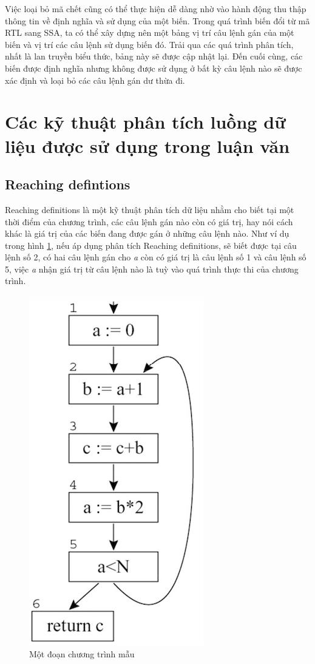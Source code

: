 Việc loại bỏ mã chết cũng có thể thực hiện dễ dàng nhờ vào hành động thu thập thông tin về định nghĩa và sử dụng của một biến. Trong quá trình biến đổi từ mã RTL sang SSA, ta có thể xây dựng nên một bảng vị trí câu lệnh gán của một biến và vị trí các câu lệnh sử dụng biến đó. Trải qua các quá trình phân tích, nhất là lan truyền biểu thức, bảng này sẽ được cập nhật lại. Đến cuối cùng, các biến được định nghĩa nhưng không được sử dụng ở bất kỳ câu lệnh nào sẽ được xác định và loại bỏ các câu lệnh gán dư thừa đi.\\
\section{Các kỹ thuật phân tích luồng dữ liệu được sử dụng trong luận văn}
\subsection{Reaching defintions}
\label{sec:reachdef}
Reaching definitions \cite{reachingdef} là một kỹ thuật phân tích dữ liệu nhằm cho biết tại một thời điểm của chương trình, các câu lệnh gán nào còn có giá trị, hay nói cách khác là giá trị của các biến đang được gán ở những câu lệnh nào. Như ví dụ trong hình \ref{fig:reachingdefexam}, nếu áp dụng phân tích Reaching definitions, sẽ biết được tại câu lệnh số 2, có hai câu lệnh gán cho \textit{a} còn có giá trị là câu lệnh số 1 và câu lệnh số 5, việc \textit{a} nhận giá trị từ câu lệnh nào là tuỳ vào quá trình thực thi của chương trình.
\begin{figure}[h!]
	\centering
	\includegraphics[scale=0.75]{image/reachingDefExam}
	\caption{Một đoạn chương trình mẫu}
	\label{fig:reachingdefexam}
\end{figure}


